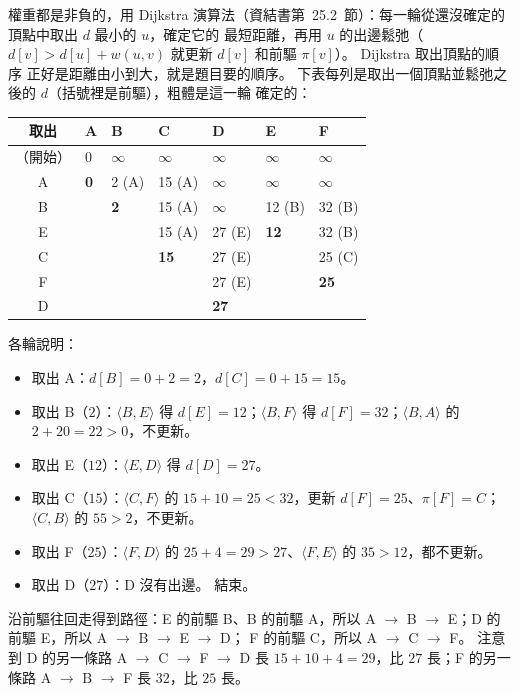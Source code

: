 \begin{pastsoln}
權重都是非負的，用 Dijkstra 演算法（資結書第~25.2~節）：每一輪從還沒確定的頂點中取出 $d$ 最小的 $u$，確定它的
最短距離，再用 $u$ 的出邊鬆弛（$d[v] > d[u] + w(u, v)$ 就更新 $d[v]$ 和前驅 $\pi[v]$）。 Dijkstra 取出頂點的順序
正好是距離由小到大，就是題目要的順序。 下表每列是取出一個頂點並鬆弛之後的 $d$（括號裡是前驅），粗體是這一輪
確定的：
\begin{center}
\small
\begin{tabular}{cllllll}
\toprule
取出 & A & B & C & D & E & F \\
\midrule
（開始） & 0 & $\infty$ & $\infty$ & $\infty$ & $\infty$ & $\infty$ \\
A & \textbf{0} & 2 (A) & 15 (A) & $\infty$ & $\infty$ & $\infty$ \\
B & & \textbf{2} & 15 (A) & $\infty$ & 12 (B) & 32 (B) \\
E & & & 15 (A) & 27 (E) & \textbf{12} & 32 (B) \\
C & & & \textbf{15} & 27 (E) & & 25 (C) \\
F & & & & 27 (E) & & \textbf{25} \\
D & & & & \textbf{27} & & \\
\bottomrule
\end{tabular}
\end{center}
各輪說明：
\begin{itemize}
\item 取出 A：$d[B] = 0 + 2 = 2$，$d[C] = 0 + 15 = 15$。
\item 取出 B（$2$）：$\langle B, E\rangle$ 得 $d[E] = 12$；$\langle B, F\rangle$ 得 $d[F] = 32$；$\langle B, A\rangle$ 的
$2 + 20 = 22 > 0$，不更新。
\item 取出 E（$12$）：$\langle E, D\rangle$ 得 $d[D] = 27$。
\item 取出 C（$15$）：$\langle C, F\rangle$ 的 $15 + 10 = 25 < 32$，更新 $d[F] = 25$、$\pi[F] = C$；$\langle C, B\rangle$
的 $55 > 2$，不更新。
\item 取出 F（$25$）：$\langle F, D\rangle$ 的 $25 + 4 = 29 > 27$、$\langle F, E\rangle$ 的 $35 > 12$，都不更新。
\item 取出 D（$27$）：D 沒有出邊。 結束。
\end{itemize}
沿前驅往回走得到路徑：E 的前驅 B、B 的前驅 A，所以 A $\to$ B $\to$ E；D 的前驅 E，所以 A $\to$ B $\to$ E $\to$ D；
F 的前驅 C，所以 A $\to$ C $\to$ F。 注意到 D 的另一條路 A $\to$ C $\to$ F $\to$ D 長 $15 + 10 + 4 = 29$，比 $27$
長；F 的另一條路 A $\to$ B $\to$ F 長 $32$，比 $25$ 長。
\end{pastsoln}
